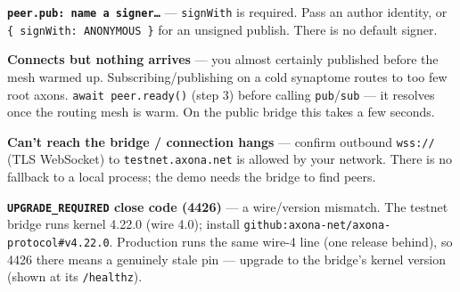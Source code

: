 \documentclass[
  nobib]{tufte-handout}
\begin{document}
\textbf{\texttt{peer.pub:\ name\ a\ signer…}} --- \texttt{signWith} is
required. Pass an author identity, or
\texttt{\{\ signWith:\ ANONYMOUS\ \}} for an unsigned publish. There is
no default signer.

\textbf{Connects but nothing arrives} --- you almost certainly published
before the mesh warmed up. Subscribing/publishing on a cold synaptome
routes to too few root axons. \texttt{await\ peer.ready()} (step 3)
before calling \texttt{pub}/\texttt{sub} --- it resolves once the
routing mesh is warm. On the public bridge this takes a few seconds.

\textbf{Can't reach the bridge / connection hangs} --- confirm outbound
\texttt{wss://} (TLS WebSocket) to \texttt{testnet.axona.net} is allowed
by your network. There is no fallback to a local process; the demo needs
the bridge to find peers.

\textbf{\texttt{UPGRADE\_REQUIRED} close code (4426)} --- a wire/version
mismatch. The testnet bridge runs kernel 4.22.0 (wire 4.0); install
\texttt{github:axona-net/axona-protocol\#v4.22.0}. Production runs the
same wire-4 line (one release behind), so 4426 there means a genuinely
stale pin --- upgrade to the bridge's kernel version (shown at its
\texttt{/healthz}).
\end{document}
